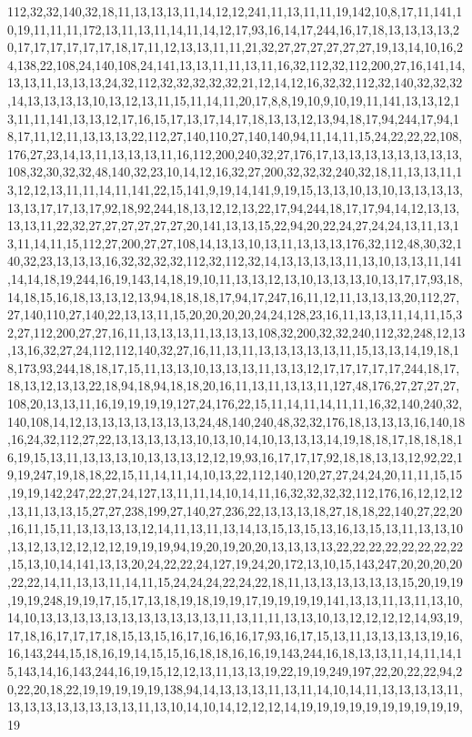 112,32,32,140,32,18,11,13,13,13,11,14,12,12,241,11,13,11,11,19,142,10,8,17,11,141,10,19,11,11,11,172,13,11,13,11,14,11,14,12,17,93,16,14,17,244,16,17,18,13,13,13,13,20,17,17,17,17,17,17,18,17,11,12,13,13,11,11,21,32,27,27,27,27,27,27,19,13,14,10,16,24,138,22,108,24,140,108,24,141,13,13,11,11,13,11,16,32,112,32,112,200,27,16,141,14,13,13,11,13,13,13,24,32,112,32,32,32,32,32,21,12,14,12,16,32,32,112,32,140,32,32,32,14,13,13,13,13,10,13,12,13,11,15,11,14,11,20,17,8,8,19,10,9,10,19,11,141,13,13,12,13,11,11,141,13,13,12,17,16,15,17,13,17,14,17,18,13,13,12,13,94,18,17,94,244,17,94,18,17,11,12,11,13,13,13,22,112,27,140,110,27,140,140,94,11,14,11,15,24,22,22,22,108,176,27,23,14,13,11,13,13,13,11,16,112,200,240,32,27,176,17,13,13,13,13,13,13,13,13,108,32,30,32,32,48,140,32,23,10,14,12,16,32,27,200,32,32,32,240,32,18,11,13,13,11,13,12,12,13,11,11,14,11,141,22,15,141,9,19,14,141,9,19,15,13,13,10,13,10,13,13,13,13,13,13,17,17,13,17,92,18,92,244,18,13,12,12,13,22,17,94,244,18,17,17,94,14,12,13,13,13,13,11,22,32,27,27,27,27,27,27,20,141,13,13,15,22,94,20,22,24,27,24,24,13,11,13,13,11,14,11,15,112,27,200,27,27,108,14,13,13,10,13,11,13,13,13,176,32,112,48,30,32,140,32,23,13,13,13,16,32,32,32,32,112,32,112,32,14,13,13,13,13,11,13,10,13,13,11,141,14,14,18,19,244,16,19,143,14,18,19,10,11,13,13,12,13,10,13,13,13,10,13,17,17,93,18,14,18,15,16,18,13,13,12,13,94,18,18,18,17,94,17,247,16,11,12,11,13,13,13,20,112,27,27,140,110,27,140,22,13,13,11,15,20,20,20,20,24,24,128,23,16,11,13,13,11,14,11,15,32,27,112,200,27,27,16,11,13,13,13,11,13,13,13,108,32,200,32,32,240,112,32,248,12,13,13,16,32,27,24,112,112,140,32,27,16,11,13,11,13,13,13,13,13,11,15,13,13,14,19,18,18,173,93,244,18,18,17,15,11,13,13,10,13,13,13,11,13,13,12,17,17,17,17,17,244,18,17,18,13,12,13,13,22,18,94,18,94,18,18,20,16,11,13,11,13,13,11,127,48,176,27,27,27,27,108,20,13,13,11,16,19,19,19,19,127,24,176,22,15,11,14,11,14,11,11,16,32,140,240,32,140,108,14,12,13,13,13,13,13,13,13,24,48,140,240,48,32,32,176,18,13,13,13,16,140,18,16,24,32,112,27,22,13,13,13,13,13,10,13,10,14,10,13,13,13,14,19,18,18,17,18,18,18,16,19,15,13,11,13,13,13,10,13,13,13,12,12,19,93,16,17,17,17,92,18,18,13,13,12,92,22,19,19,247,19,18,18,22,15,11,14,11,14,10,13,22,112,140,120,27,27,24,24,20,11,11,15,15,19,19,142,247,22,27,24,127,13,11,11,14,10,14,11,16,32,32,32,32,112,176,16,12,12,12,13,11,13,13,15,27,27,238,199,27,140,27,236,22,13,13,13,18,27,18,18,22,140,27,22,20,16,11,15,11,13,13,13,13,12,14,11,13,11,13,14,13,15,13,15,13,16,13,15,13,11,13,13,10,13,12,13,12,12,12,12,19,19,19,94,19,20,19,20,20,13,13,13,13,22,22,22,22,22,22,22,22,15,13,10,14,141,13,13,20,24,22,22,24,127,19,24,20,172,13,10,15,143,247,20,20,20,20,22,22,14,11,13,13,11,14,11,15,24,24,24,22,24,22,18,11,13,13,13,13,13,13,15,20,19,19,19,19,248,19,19,17,15,17,13,18,19,18,19,19,17,19,19,19,19,141,13,13,11,13,11,13,10,14,10,13,13,13,13,13,13,13,13,13,13,13,11,13,11,11,13,13,10,13,12,12,12,12,14,93,19,17,18,16,17,17,17,18,15,13,15,16,17,16,16,16,17,93,16,17,15,13,11,13,13,13,13,19,16,16,143,244,15,18,16,19,14,15,15,16,18,18,16,16,19,143,244,16,18,13,13,11,14,11,14,15,143,14,16,143,244,16,19,15,12,12,13,11,13,13,19,22,19,19,249,197,22,20,22,22,94,20,22,20,18,22,19,19,19,19,19,138,94,14,13,13,13,11,13,11,14,10,14,11,13,13,13,13,11,13,13,13,13,13,13,13,13,11,13,10,14,10,14,12,12,12,14,19,19,19,19,19,19,19,19,19,19,19